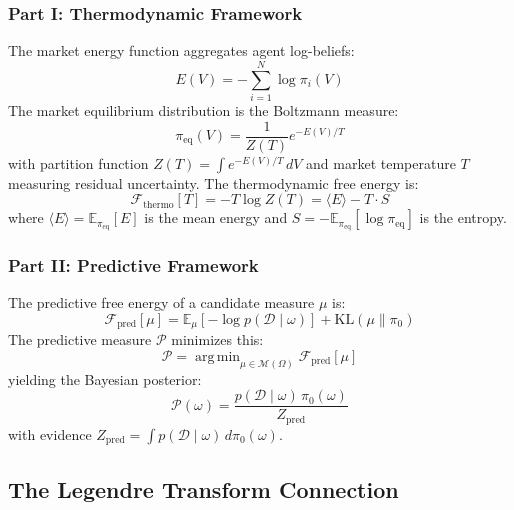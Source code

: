 \documentclass[12pt,a4paper]{article}
\theoremstyle{definition}
\newcommand{\E}{\mathbb{E}}
\newcommand{\M}{\mathcal{M}}
\newcommand{\PP}{\mathcal{P}}
\newcommand{\KL}{\mathrm{KL}}
\DeclareMathOperator*{\argmin}{arg\,min}
\begin{document}
\subsubsection{Part I: Thermodynamic Framework}

The market energy function aggregates agent log-beliefs:
\begin{equation}\label{eq:energy_recap}
    E(V) = -\sum_{i=1}^{N} \log \pi_i(V)
\end{equation}
The market equilibrium distribution is the Boltzmann measure:
\begin{equation}\label{eq:boltzmann_recap}
    \pi_{\text{eq}}(V) = \frac{1}{Z(T)} e^{-E(V)/T}
\end{equation}
with partition function $Z(T) = \int e^{-E(V)/T} \, dV$ and market temperature $T$ measuring residual uncertainty. The thermodynamic free energy is:
\begin{equation}\label{eq:thermo_free_recap}
    \mathcal{F}_{\text{thermo}}[T] = -T \log Z(T) = \langle E \rangle - T \cdot S
\end{equation}
where $\langle E \rangle = \E_{\pi_{\text{eq}}}[E]$ is the mean energy and $S = -\E_{\pi_{\text{eq}}}[\log \pi_{\text{eq}}]$ is the entropy.

\subsubsection{Part II: Predictive Framework}

The predictive free energy of a candidate measure $\mu$ is:
\begin{equation}\label{eq:pred_free_recap}
    \mathcal{F}_{\text{pred}}[\mu] = \E_\mu[-\log p(\mathcal{D} \mid \omega)] + \KL(\mu \| \pi_0)
\end{equation}
The predictive measure $\PP$ minimizes this:
\begin{equation}\label{eq:predictive_opt_recap}
    \PP = \argmin_{\mu \in \M(\Omega)} \mathcal{F}_{\text{pred}}[\mu]
\end{equation}
yielding the Bayesian posterior:
\begin{equation}\label{eq:posterior_recap}
    \PP(\omega) = \frac{p(\mathcal{D} \mid \omega) \, \pi_0(\omega)}{Z_{\text{pred}}}
\end{equation}
with evidence $Z_{\text{pred}} = \int p(\mathcal{D} \mid \omega) \, d\pi_0(\omega)$.

\subsection{The Legendre Transform Connection}
\end{document}
